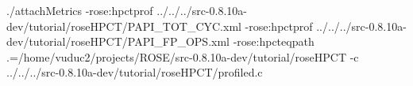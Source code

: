 ./attachMetrics 
  -rose:hpctprof ../../../src-0.8.10a-dev/tutorial/roseHPCT/PAPI_TOT_CYC.xml 
  -rose:hpctprof ../../../src-0.8.10a-dev/tutorial/roseHPCT/PAPI_FP_OPS.xml 
  -rose:hpcteqpath .=/home/vuduc2/projects/ROSE/src-0.8.10a-dev/tutorial/roseHPCT
  -c ../../../src-0.8.10a-dev/tutorial/roseHPCT/profiled.c
